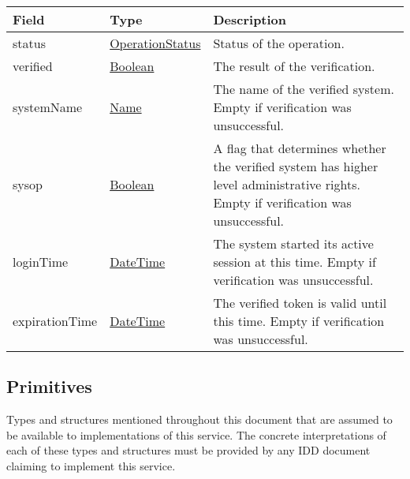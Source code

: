 \documentclass[a4paper]{arrowhead}
\newcommand{\pref}[1]{{\textcolor{ArrowheadGrey}{\hyperref[sec:model:primitives:#1]{#1}}}}
\begin{document}
 
\begin{table}[ht!]
\begin{tabularx}{\textwidth}{| p{4.25cm} | p{4cm} | X |} \hline
\rowcolor{gray!33} Field & Type      & Description \\ \hline
status & \pref{OperationStatus} & Status of the operation. \\ \hline
verified & \pref{Boolean} & The result of the verification. \\ \hline
systemName & \pref{Name} & The name of the verified system. Empty if verification was unsuccessful. \\ \hline
sysop & \pref{Boolean} & A flag that determines whether the verified system has higher level administrative rights. Empty if verification was unsuccessful. \\ \hline
loginTime & \pref{DateTime} & The system started its active session at this time. Empty if verification was unsuccessful. \\ \hline
expirationTime & \pref{DateTime} & The verified token is valid until this time. Empty if verification was unsuccessful. \\ \hline
\end{tabularx}
\end{table}

\subsection{Primitives}
\label{sec:model:primitives}

Types and structures mentioned throughout this document that are assumed to be available to implementations of this service.
The concrete interpretations of each of these types and structures must be provided by any IDD document claiming to implement this service.
\end{document}
